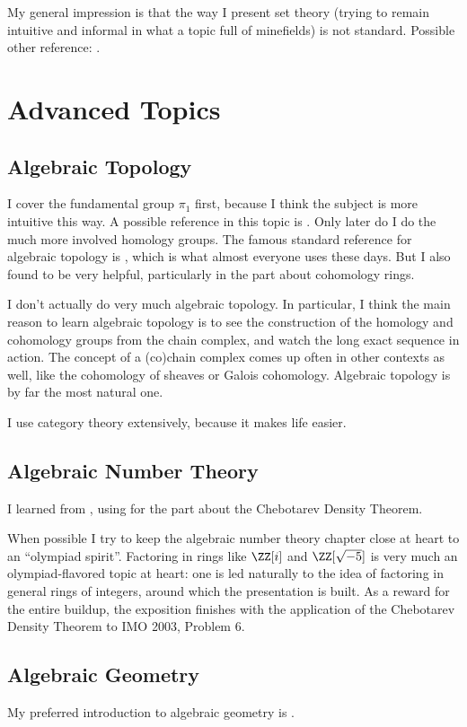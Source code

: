 My general impression is that the way I present set theory
(trying to remain intuitive and informal in what a topic full of minefields)
is not standard. Possible other reference: \cite{ref:miquel}.

\section{Advanced Topics}
\subsection{Algebraic Topology}
I cover the fundamental group $\pi_1$ first, because I think the subject is more
intuitive this way. A possible reference in this topic is \cite{ref:munkres}.
Only later do I do the much more involved homology groups.
The famous standard reference for algebraic topology is \cite{ref:hatcher},
which is what almost everyone uses these days.
But I also found \cite{ref:maxim752} to be very helpful,
particularly in the part about cohomology rings.

I don't actually do very much algebraic topology.
In particular, I think the main reason to learn algebraic topology
is to see the construction of the homology and cohomology groups
from the chain complex, and watch the long exact sequence in action.
The concept of a (co)chain complex comes up often in other contexts as well,
like the cohomology of sheaves or Galois cohomology.
Algebraic topology is by far the most natural one.

I use category theory extensively, because it makes life easier.

\subsection{Algebraic Number Theory}
I learned from \cite{ref:oggier_NT}, using \cite{ref:lenstra_chebotarev}
for the part about the Chebotarev Density Theorem.

When possible I try to keep the algebraic number theory chapter close at
heart to an ``olympiad spirit''.
Factoring in rings like $\ZZ[i]$ and $\ZZ[\sqrt{-5}]$
is very much an olympiad-flavored topic at heart:
one is led naturally to the idea of factoring in general rings of integers,
around which the presentation is built.
As a reward for the entire buildup, the exposition finishes
with the application of the Chebotarev Density Theorem to IMO 2003, Problem 6.

\subsection{Algebraic Geometry}
My preferred introduction to algebraic geometry is \cite{ref:gathmann}.

